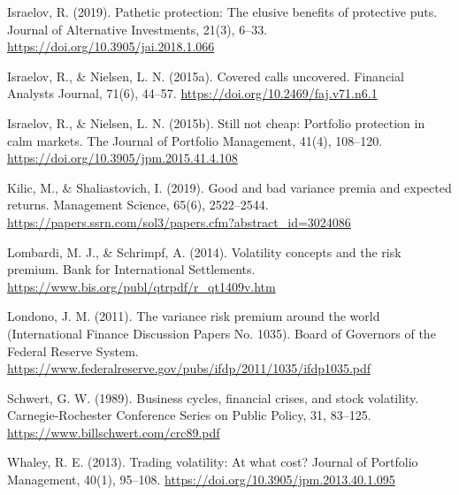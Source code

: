 \documentclass[11pt,a4paper]{article}
\begin{document}
\begin{fshfreferences}
\item Israelov, R. (2019). Pathetic protection: The elusive benefits of protective puts. Journal of Alternative Investments, 21(3), 6--33. \url{https://doi.org/10.3905/jai.2018.1.066}
\item Israelov, R., \& Nielsen, L. N. (2015a). Covered calls uncovered. Financial Analysts Journal, 71(6), 44--57. \url{https://doi.org/10.2469/faj.v71.n6.1}
\item Israelov, R., \& Nielsen, L. N. (2015b). Still not cheap: Portfolio protection in calm markets. The Journal of Portfolio Management, 41(4), 108--120. \url{https://doi.org/10.3905/jpm.2015.41.4.108}
\item Kilic, M., \& Shaliastovich, I. (2019). Good and bad variance premia and expected returns. Management Science, 65(6), 2522--2544. \url{https://papers.ssrn.com/sol3/papers.cfm?abstract_id=3024086}
\item Lombardi, M. J., \& Schrimpf, A. (2014). Volatility concepts and the risk premium. Bank for International Settlements. \url{https://www.bis.org/publ/qtrpdf/r_qt1409v.htm}
\item Londono, J. M. (2011). The variance risk premium around the world (International Finance Discussion Papers No. 1035). Board of Governors of the Federal Reserve System. \url{https://www.federalreserve.gov/pubs/ifdp/2011/1035/ifdp1035.pdf}
\item Schwert, G. W. (1989). Business cycles, financial crises, and stock volatility. Carnegie-Rochester Conference Series on Public Policy, 31, 83--125. \url{https://www.billschwert.com/crc89.pdf}
\item Whaley, R. E. (2013). Trading volatility: At what cost? Journal of Portfolio Management, 40(1), 95--108. \url{https://doi.org/10.3905/jpm.2013.40.1.095}
\end{fshfreferences}

\end{document}
